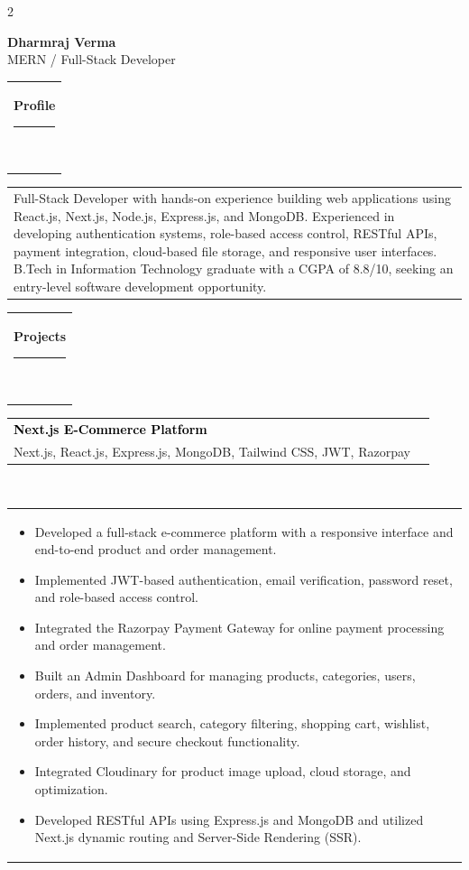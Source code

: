 \documentclass[10pt,A4,english]{article}
\newcommand{\mpwidth}{\linewidth-\fboxsep-\fboxsep}
\newcommand{\cvtext}[1]{\begin{tabular*}{1\mpwidth}{p{0.98\mpwidth}}\parbox{1\mpwidth}{#1}\end{tabular*}}
\newcommand{\cvsection}[1]{\vspace{10pt}\cvtext{\textbf{\LARGE{\textcolor{darkcol}{#1}}}\\[-4pt]\textcolor{accentcol}{\rule{0.2\textwidth}{1.5pt}}\\}}
\newcommand{\cvevent}[4]{
  \parbox{\mpwidth}{
    \begin{tabular*}{1\mpwidth}{p{0.66\mpwidth} r}
      \textcolor{black}{\textbf{#2}} &
      \colorbox{accentcol}{\makebox[0.32\mpwidth]{\textcolor{white}{\textbf{#1}}}}\\
      \textcolor{maincol}{#3}&\\
    \end{tabular*}\\[5pt]
    \cvtext{#4}
  }\vspace{8pt}
}
\begin{document}
\begin{paracol}{2}
\begin{leftcolumn}
\end{leftcolumn}

\begin{rightcolumn}

\vspace{8pt}
{\Huge\textbf{\textcolor{accentcol}{Dharmraj Verma}}}\\[-2pt]
{\Large\textcolor{darkcol}{MERN / Full-Stack Developer}}

\cvsection{Profile}
\cvtext{
Full-Stack Developer with hands-on experience building web applications using React.js, Next.js, Node.js, Express.js, and MongoDB. Experienced in developing authentication systems, role-based access control, RESTful APIs, payment integration, cloud-based file storage, and responsive user interfaces. B.Tech in Information Technology graduate with a CGPA of 8.8/10, seeking an entry-level software development opportunity.
}

\cvsection{Projects}

\cvevent{2025--2026}
{Next.js E-Commerce Platform}
{Next.js, React.js, Express.js, MongoDB, Tailwind CSS, JWT, Razorpay}
{\begin{itemize}[leftmargin=*,itemsep=2pt,topsep=2pt]
\item Developed a full-stack e-commerce platform with a responsive interface and end-to-end product and order management.
\item Implemented JWT-based authentication, email verification, password reset, and role-based access control.
\item Integrated the Razorpay Payment Gateway for online payment processing and order management.
\item Built an Admin Dashboard for managing products, categories, users, orders, and inventory.
\item Implemented product search, category filtering, shopping cart, wishlist, order history, and secure checkout functionality.
\item Integrated Cloudinary for product image upload, cloud storage, and optimization.
\item Developed RESTful APIs using Express.js and MongoDB and utilized Next.js dynamic routing and Server-Side Rendering (SSR).
\end{itemize}}


\end{rightcolumn}
\end{paracol}
\end{document}
